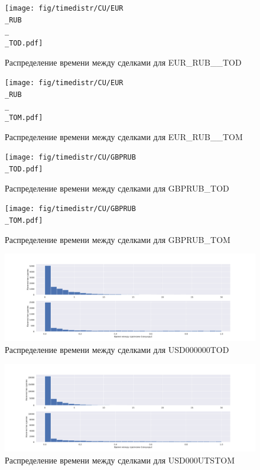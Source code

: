 \begin{appendices}
        \begin{figure}
                \texttt{[image: fig/timedistr/CU/EUR\\\_RUB\\\_\\\_TOD.pdf]}
                \caption{Распределение времени между сделками для EUR\_RUB\_\_TOD}
                \label{app}
        \end{figure}
        \begin{figure}
            \texttt{[image: fig/timedistr/CU/EUR\\\_RUB\\\_\\\_TOM.pdf]}
            \caption{Распределение времени между сделками для EUR\_RUB\_\_TOM}
            \label{app}
        \end{figure}
        \begin{figure}
                \texttt{[image: fig/timedistr/CU/GBPRUB\\\_TOD.pdf]}
                \caption{Распределение времени между сделками для GBPRUB\_TOD}
                \label{app}
        \end{figure}
        \begin{figure}
                \texttt{[image: fig/timedistr/CU/GBPRUB\\\_TOM.pdf]}
                \caption{Распределение времени между сделками для GBPRUB\_TOM}
                \label{app}
        \end{figure}
        \begin{figure}
                \includegraphics[scale=0.35]{fig/timedistr/CU/USD000000TOD.pdf}
                \caption{Распределение времени между сделками для USD000000TOD}
                \label{app}
        \end{figure}
        \begin{figure}
                \includegraphics[scale=0.35]{fig/timedistr/CU/USD000UTSTOM.pdf}
                \caption{Распределение времени между сделками для USD000UTSTOM}
                \label{append}
        \end{figure}



\end{appendices}   %